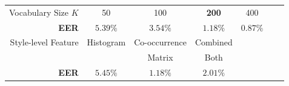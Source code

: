 \begin{table}[!btph]
\begin{tabular}{|r|cccccc|}
Vocabulary Size  \textbf{$K$}   	& 50   		 & 100    	  & \textbf{200}       & 400 	   &    &   \\
  \textbf{EER} & $5.39\% $ & $3.54\%$  & \textbf{$1.18\%$} & $0.87\%$ &    &   \\  \hline \hline  
  
Style-level Feature    	& Histogram   		 & Co-occurrence    	  & Combined        &  	   &    &   \\
      &    		 & Matrix    	  & Both       &  	   &    &   \\
  \textbf{EER} & $5.45\% $ & $1.18\%$  & \textbf{$2.01\%$} &   &    &   \\  \hline   
  
\end{tabular}
\vspace{-0mm}
\end{table}







%

